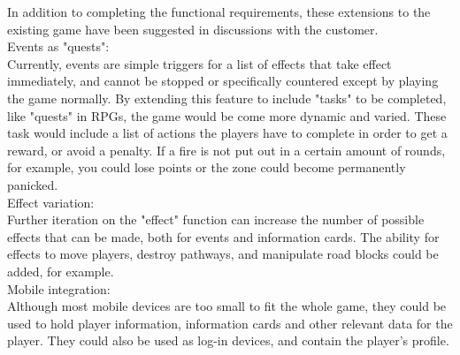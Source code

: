 In addition to completing the functional requirements, these extensions to the existing game have been suggested in discussions with the customer.
\\
Events as "quests":\\
Currently, events are simple triggers for a list of effects that take effect immediately, and cannot be stopped or specifically countered except by playing the game normally. By extending this feature to include "tasks" to be completed, like "quests" in RPGs, the game would be come more dynamic and varied. These task would include a list of actions the players have to complete in order to get a reward, or avoid a penalty. If a fire is not put out in a certain amount of rounds, for example, you could lose points or the zone could become permanently panicked.
\\
Effect variation:\\
Further iteration on the "effect" function can increase the number of possible effects that can be made, both for events and information cards. The ability for effects to move players, destroy pathways, and manipulate road blocks could be added, for example.
\\
Mobile integration:\\
Although most mobile devices are too small to fit the whole game, they could be used to hold player information, information cards and other relevant data for the player. They could also be used as log-in devices, and contain the player's profile.\\


